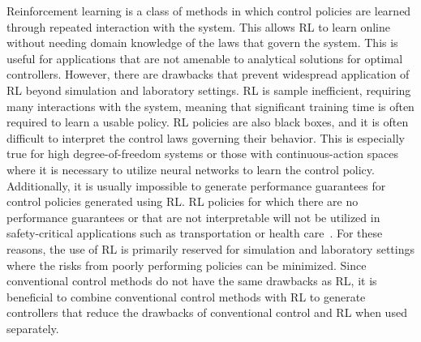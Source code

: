 Reinforcement learning is a class of methods in which control policies are learned through repeated interaction with the system\cite{Sutton:2018a,Li:2017a}. This allows RL to learn online without needing domain knowledge of the laws that govern the system. This is useful for applications that are not amenable to analytical solutions for optimal controllers.
However, there are drawbacks that prevent widespread application of RL beyond simulation and laboratory settings.
RL is sample inefficient, requiring many interactions with the system, meaning that significant training time is often required to learn a usable policy. RL policies are also black boxes, and it is often difficult to interpret the control laws governing their behavior.
%
This is especially true for high degree-of-freedom systems or those with continuous-action spaces where it is necessary to utilize neural networks to learn the control policy.
Additionally, it is usually impossible to generate performance guarantees for control policies generated using RL.
RL policies for which there are no performance guarantees or that are not interpretable will not be utilized in safety-critical applications such as transportation or health care~\cite{Cheng:2019a,Hart:2019a,Tambon:2022a}.
%
For these reasons, the use of RL is primarily reserved for simulation and laboratory settings where the risks from poorly performing policies can be minimized.
%
%
Since conventional control methods do not have the same drawbacks as RL,
%
it is beneficial to combine conventional control methods with RL to generate controllers that reduce the drawbacks of conventional control and RL when used separately.

